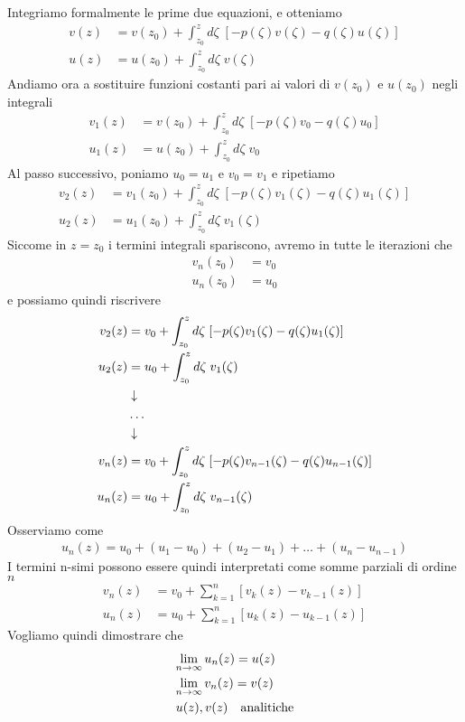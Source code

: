 Integriamo formalmente le prime due equazioni, e otteniamo
\begin{align}
	v(z) &= v(z_0) + \int_{z_0}^{z} d\zeta\; [-p(\zeta) v(\zeta) - q(\zeta)u(\zeta)]\\
	u(z) &= u(z_0) + \int_{z_0}^{z} d\zeta \; v(\zeta) 
\end{align}
Andiamo ora a sostituire funzioni costanti pari ai valori di $v(z_0)$ e $u(z_0)$ negli integrali
\begin{align}
	v_1(z) &= v(z_0) + \int_{z_0}^{z} d\zeta\; [-p(\zeta) v_0 - q(\zeta)u_0]\\
	u_1(z) &= u(z_0) + \int_{z_0}^{z} d\zeta \; v_0 
\end{align}
Al passo successivo, poniamo $u_0 = u_1$ e $v_0=v_1$ e ripetiamo
\begin{align}
	v_2(z) &= v_1(z_0) + \int_{z_0}^{z} d\zeta\; [-p(\zeta) v_1(\zeta) - q(\zeta)u_1(\zeta)]\\
	u_2(z) &= u_1(z_0) + \int_{z_0}^{z} d\zeta \; v_1(\zeta) 
\end{align}
Siccome in $z=z_0$ i termini integrali spariscono, avremo in tutte le iterazioni che
\begin{align}
	v_n(z_0) &= v_0\\
	u_n(z_0) &= u_0
\end{align}
e possiamo quindi riscrivere
\begin{align}
	v_2(z) &= v_0 + \int_{z_0}^{z} d\zeta\; [-p(\zeta) v_1(\zeta) - q(\zeta)u_1(\zeta)]\\
	u_2(z) &= u_0 + \int_{z_0}^{z} d\zeta \; v_1(\zeta) \\ &\downarrow \nonumber \\
	&\dots \nonumber \\ &\downarrow \nonumber \\
	v_n(z) &= v_0 + \int_{z_0}^{z} d\zeta\; [-p(\zeta) v_{n-1}(\zeta) - q(\zeta)u_{n-1}(\zeta)]\\ 
	u_n(z) &= u_0 + \int_{z_0}^{z} d\zeta \; v_{n-1}(\zeta)
\end{align}
Osserviamo come
\begin{align}
	u_n(z) = u_0 + (u_1 - u_0) + (u_2 - u_1) + \dots + (u_n - u_{n-1})
\end{align}
I termini n-simi possono essere quindi interpretati come somme parziali di ordine $n$
\begin{align}
	v_n(z) &= v_0 + \sum_{k=1}^{n} [v_{k}(z) - v_{k-1}(z)]\\ 
	u_n(z) &= u_0 + \sum_{k=1}^{n} [u_{k}(z) - u_{k-1}(z)]
\end{align}
Vogliamo quindi dimostrare che
\begin{align}
	&\underset{n \rightarrow \infty}{\lim} \, u_n(z) = u(z)\\
	&\underset{n \rightarrow \infty}{\lim} \, v_n(z) = v(z)\\
	&u(z), v(z) \quad \text{analitiche}
\end{align}
